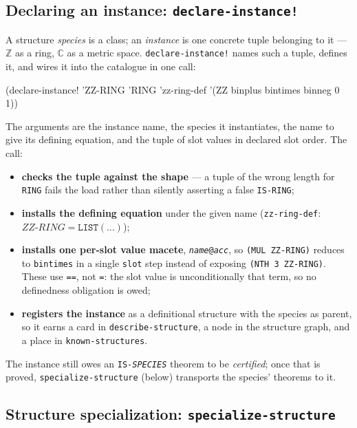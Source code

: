 \subsection{Declaring an instance: \texttt{declare-instance!}}
\label{sec:declare-instance}

A structure \emph{species} is a class; an \emph{instance} is one concrete tuple
belonging to it --- $\mathbb{Z}$ as a ring, $\mathbb{C}$ as a metric space.
\texttt{declare-instance!} names such a tuple, defines it, and wires it into the
catalogue in one call:

\begin{VNBcode}
(declare-instance! 'ZZ-RING 'RING 'zz-ring-def
  '(ZZ binplus bintimes binneg 0 1))
\end{VNBcode}

The arguments are the instance name, the species it instantiates, the name to
give its defining equation, and the tuple of slot values in declared slot order.
The call:
\begin{itemize}
\item \textbf{checks the tuple against the shape} --- a tuple of the wrong length
  for \texttt{RING} fails the load rather than silently asserting a false
  \texttt{IS-RING};
\item \textbf{installs the defining equation} under the given name
  (\texttt{zz-ring-def}: $\mathit{ZZ\text{-}RING} = \mathtt{LIST}(\ldots)$);
\item \textbf{installs one per-slot value macete}, \texttt{\textit{name}@\textit{acc}},
  so \texttt{(MUL ZZ-RING)} reduces to \texttt{bintimes} in a single
  \texttt{slot} step instead of exposing \texttt{(NTH 3 ZZ-RING)}.  These use
  \texttt{==}, not \texttt{=}: the slot value is unconditionally that term, so no
  definedness obligation is owed;
\item \textbf{registers the instance} as a definitional structure with the
  species as parent, so it earns a card in \texttt{describe-structure}, a node in
  the structure graph, and a place in \texttt{known-structures}.
\end{itemize}
The instance still owes an \texttt{IS-\textit{SPECIES}} theorem to be
\emph{certified}; once that is proved, \texttt{specialize-structure} (below)
transports the species' theorems to it.

\subsection{Structure specialization: \texttt{specialize-structure}}
\label{sec:specialize-structure}

